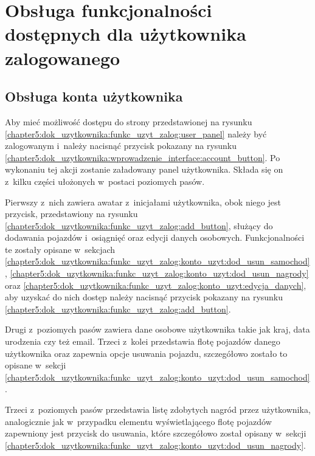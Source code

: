 \documentclass[../Kamil_Kowalewski_Main.tex]{subfiles}
\begin{document}
{    \section{Obsługa funkcjonalności dostępnych dla użytkownika zalogowanego}
    \label{chapter5:dok_uzytkownika:funkc_uzyt_zalog} {

        \subsection{Obsługa konta użytkownika}
        \label{chapter5:dok_uzytkownika:funkc_uzyt_zalog:konto_uzyt} {
            Aby mieć możliwość dostępu do strony przedstawionej na rysunku
            \ref{chapter5:dok_uzytkownika:funkc_uzyt_zalog:user_panel} należy być
            zalogowanym i~należy nacisnąć przycisk pokazany na rysunku
            \ref{chapter5:dok_uzytkownika:wprowadzenie_interface:account_button}. Po
            wykonaniu tej akcji zostanie załadowany panel użytkownika. Składa się on
            z~kilku części ułożonych w~postaci poziomych pasów.

            Pierwszy z~nich zawiera awatar z~inicjałami użytkownika, obok niego jest
            przycisk, przedstawiony na rysunku
            \ref{chapter5:dok_uzytkownika:funkc_uzyt_zalog:add_button}, służący do
            dodawania pojazdów i~osiągnięć oraz edycji danych osobowych. Funkcjonalności
            te zostały opisane w~sekcjach
            \ref{chapter5:dok_uzytkownika:funkc_uzyt_zalog:konto_uzyt:dod_usun_samochod},
            \ref{chapter5:dok_uzytkownika:funkc_uzyt_zalog:konto_uzyt:dod_usun_nagrody} oraz
            \ref{chapter5:dok_uzytkownika:funkc_uzyt_zalog:konto_uzyt:edycja_danych},
            aby uzyskać do nich dostęp należy nacisnąć przycisk pokazany na rysunku
            \ref{chapter5:dok_uzytkownika:funkc_uzyt_zalog:add_button}.

            Drugi z~poziomych pasów zawiera dane osobowe użytkownika takie jak kraj, data urodzenia
            czy też email. Trzeci z~kolei przedstawia flotę pojazdów danego użytkownika
            oraz zapewnia opcje usuwania pojazdu, szczegółowo zostało to opisane w~sekcji
            \ref{chapter5:dok_uzytkownika:funkc_uzyt_zalog:konto_uzyt:dod_usun_samochod}.

            Trzeci z~poziomych pasów przedstawia listę zdobytych nagród przez
            użytkownika, analogicznie jak w~przypadku elementu wyświetlającego flotę
            pojazdów zapewniony jest przycisk do usuwania, które szczegółowo został
            opisany w~sekcji
            \ref{chapter5:dok_uzytkownika:funkc_uzyt_zalog:konto_uzyt:dod_usun_nagrody}.

}}}
\end{document}
